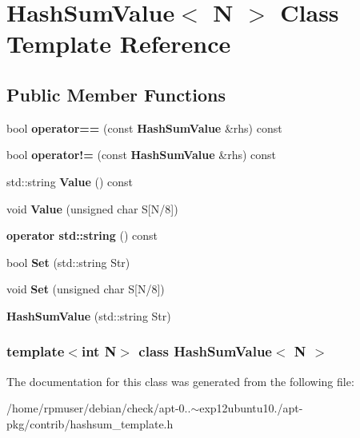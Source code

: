 \section{\-Hash\-Sum\-Value$<$ \-N $>$ \-Class \-Template \-Reference}
\label{classHashSumValue}
\subsection*{\-Public \-Member \-Functions}
\begin{DoxyCompactItemize}
\item 
bool {\bfseries operator==} (const {\bf \-Hash\-Sum\-Value} \&rhs) const \label{classHashSumValue_acc53bf310691d1465f99d55e38a7544a}

\item 
bool {\bfseries operator!=} (const {\bf \-Hash\-Sum\-Value} \&rhs) const \label{classHashSumValue_a32262933bd5caaaedab3bb18dfe1a599}

\item 
std\-::string {\bfseries \-Value} () const \label{classHashSumValue_aab3988c46d5e453bb99946c81531e587}

\item 
void {\bfseries \-Value} (unsigned char \-S[\-N/8])\label{classHashSumValue_a9f0c6a7b6a95f62483ece1891a19c60d}

\item 
{\bfseries operator std\-::string} () const \label{classHashSumValue_a7d27cc515e59f676f08d399124be099d}

\item 
bool {\bfseries \-Set} (std\-::string \-Str)\label{classHashSumValue_ad6624cd99d9334e1d450ed4f8e2fb6c7}

\item 
void {\bfseries \-Set} (unsigned char \-S[\-N/8])\label{classHashSumValue_a367736f262d87756778eeb9ceac9cf76}

\item 
{\bfseries \-Hash\-Sum\-Value} (std\-::string \-Str)\label{classHashSumValue_a556ecad58ded0b16d6eb28d545b5377a}

\end{DoxyCompactItemize}
\subsubsection*{template$<$int \-N$>$ class Hash\-Sum\-Value$<$ N $>$}



\-The documentation for this class was generated from the following file\-:\begin{DoxyCompactItemize}
\item 
/home/rpmuser/debian/check/apt-\/0..$\sim$exp12ubuntu10./apt-\/pkg/contrib/hashsum\-\_\-template.\-h\end{DoxyCompactItemize}
